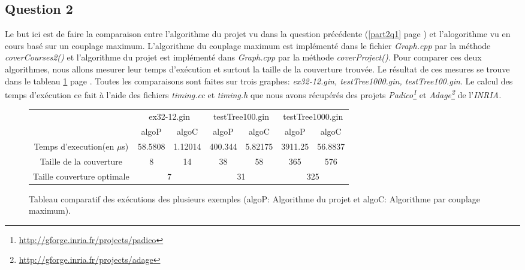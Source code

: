   \subsection{Question 2}
  Le but ici est de faire la comparaison entre l'algorithme du projet vu
  dans la question précédente (\ref{part2q1} page \pageref{part2q1}) et
  l'alogorithme vu en cours basé sur un couplage maximum.\newline
  \indent L'algorithme du couplage maximum est implémenté dans le fichier
  \emph{Graph.cpp} par la méthode \emph{coverCourses2()} et l'algorithme
  du projet est implémenté dans \emph{Graph.cpp} par la méthode
  \emph{coverProject()}.\newline
  \indent Pour comparer ces deux algorithmes, nous allons mesurer leur
  temps d'exécution et surtout la taille de la couverture trouvée. Le
  résultat de ces mesures se trouve dans le tableau \ref{tableau}
  page \pageref{tableau}. Toutes les comparaisons sont faites sur trois
  graphes: \emph{ex32-12.gin, testTree1000.gin, testTree100.gin}.\newline
  \indent Le calcul des temps d'exécution ce fait à l'aide des fichiers
  \emph{timing.cc} et \emph{timing.h} que nous avons récupérés des
  projets \emph{Padico\footnote{\url{http://gforge.inria.fr/projects/padico}}}
  et \emph{Adage\footnote{\url{http://gforge.inria.fr/projects/adage}}} de
  l'\emph{INRIA.}\newline
  
  \begin{figure}[!ht]
   \begin{center}
    \begin{tabular}{|c|c|c||c|c||c|c|}
     \cline{2-7}
     \multicolumn{1}{c|}{} & \multicolumn{2}{|c||}{ex32-12.gin}
     &\multicolumn{2}{|c||}{testTree100.gin} &
     \multicolumn{2}{|c|}{testTree1000.gin}\\ 
     \cline{2-7}
     \multicolumn{1}{c|}{} & algoP & algoC & algoP & algoC & algoP &
     algoC\\
     \hline
     Temps d'execution(en $\mu$s) & 58.5808 & 1.12014 & 400.344 &
     5.82175 & 3911.25 & 56.8837\\
     \hline
     Taille de la couverture & 8 & 14 & 38 & 58 & 365 & 576\\
     \hline
     Taille couverture optimale & \multicolumn{2}{|c||}{7} &
		 \multicolumn{2}{|c||}{31} &
     \multicolumn{2}{|c||}{325}\\ 
     \hline
    \end{tabular}
    \caption{Tableau comparatif des exécutions des plusieurs
    exemples (algoP: Algorithme du projet et algoC: Algorithme par
    couplage maximum).\label{tableau}} 
   \end{center}
  \end{figure}  

